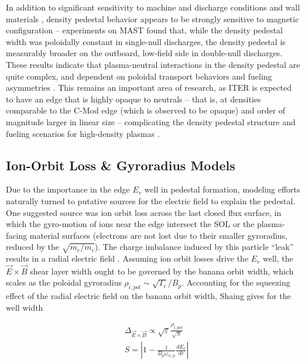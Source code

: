 In addition to significant sensitivity to machine and discharge conditions and wall materials \cite{Beurskens2011}, density pedestal behavior appears to be strongly sensitive to magnetic configuration -- experiments on MAST \cite{Maggi2010} found that, while the density pedestal width was poloidally constant in single-null discharges, the density pedestal is measurably broader on the outboard, low-field side in double-null discharges.  These results indicate that plasma-neutral interactions in the density pedestal are quite complex, and dependent on poloidal transport behaviors and fueling asymmetries \cite{Maggi2010}.  This remains an important area of research, as ITER is expected to have an edge that is highly opaque to neutrals -- that is, at densities comparable to the C-Mod edge (which is observed to be opaque) and order of magnitude larger in linear size -- complicating the density pedestal structure and fueling scenarios for high-density plasmas \cite{Hughes2007,Maggi2010}.

\subsection{Ion-Orbit Loss \& Gyroradius Models}\label{subsec:mod_ionorbitloss}

Due to the importance in the edge $E_r$ well in pedestal formation, modeling efforts naturally turned to putative sources for the electric field to explain the pedestal.  One suggested source was ion orbit loss across the last closed flux surface, in which the gyro-motion of ions near the edge intersect the SOL or the plasma-facing material surfaces (electrons are not lost due to their smaller gyroradius, reduced by the $\sqrt{m_e/m_i}$).  The charge imbalance induced by this particle ``leak'' results in a radial electric field \cite{Shaing1990}.  Assuming ion orbit losses drive the $E_r$ well, the $\vec{E}\times\vec{B}$ shear layer width ought to be governed by the banana orbit width, which scales as the poloidal gyroradius $\rho_{i,pol} \sim \sqrt{T_i}/B_p$.  Accounting for the squeezing effect of the radial electric field on the banana orbit width, Shaing \cite{Shaing1992} gives for the well width

\begin{equation}\label{eq:Shaing_width}
 \begin{aligned}
  &\Delta_{\vec{E}\times\vec{B}} \propto \sqrt{\varepsilon} \frac{\rho_{i,pol}}{\sqrt{S}}\\
  &S = \left| 1 - \frac{1}{B_p \omega_{ci,p}} \frac{dE_r}{dr}\right|
 \end{aligned}
\end{equation}

